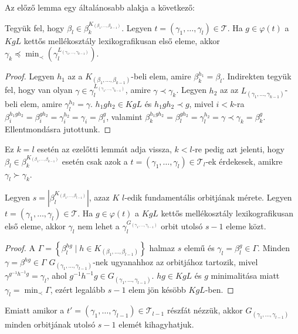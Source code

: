 Az előző lemma egy általánosabb alakja a következő:
\begin{lemma}
\label{thm:permbtcrit3}
Tegyük fel, hogy $\beta_l \in \beta_k^{K_{(\beta_1,\dots,\beta_{k-1})}}$.
Legyen $t = (\gamma_1, \dots, \gamma_l) \in \mathcal{T}$.
Ha $g \in \varphi(t)$ a $KgL$ kettős mellékosztály lexikografikusan első eleme, akkor $\gamma_k \preceq \min_{\prec}(\gamma_l^{L_{(\gamma_1,\dots,\gamma_{k-1})}})$.
\end{lemma}
\begin{proof}
Legyen $h_1$ az a $K_{(\beta_1,\dots,\beta_{k-1})}$-beli elem, amire $\beta_k^{h_1} = \beta_l$.
Indirekten tegyük fel, hogy van olyan $\gamma \in \gamma_l^{L_{(\gamma_1,\dots,\gamma_{k-1})}}$, amire $\gamma \prec \gamma_k$.
Legyen $h_2$ az az $L_{(\gamma_1,\dots,\gamma_{k-1})}$-beli elem, amire $\gamma_l^{h_2} = \gamma$.
$h_1gh_2 \in KgL$ és $h_1gh_2 \prec g$, mivel $i < k$-ra $\beta_i^{h_1gh_2} = \beta_i^{gh_2} = \gamma_i^{h_2} = \gamma_i = \beta_i^g$,
valamint $\beta_k^{h_1gh_2} = \beta_l^{gh_2} = \gamma_l^{h_2} = \gamma \prec \gamma_k = \beta_k^g$.
Ellentmondásra jutottunk.
\end{proof}
Ez $k=l$ esetén az ezelőtti lemmát adja vissza, $k < l$-re pedig azt jelenti, hogy $\beta_l \in \beta_k^{K_{(\beta_1,\dots,\beta_{k-1})}}$ esetén csak azok a $t = (\gamma_1, \dots, \gamma_l) \in \mathcal{T}_l$-ek
érdekesek, amikre $\gamma_l \succ \gamma_k$.

\begin{lemma}
\label{thm:permbtcrit4}
Legyen $s = \left| \beta_l^{K_{(\beta_1,\dots,\beta_{l-1})}} \right|$, azaz $K$ $l$-edik fundamentális orbitjának mérete.
Legyen $t = (\gamma_1, \dots, \gamma_l) \in \mathcal{T}$.
Ha $g \in \varphi(t)$ a $KgL$ kettős mellékosztály lexikografikusan első eleme, akkor $\gamma_l$ nem lehet a $\gamma_l^{G_{(\gamma_1,\dots,\gamma_{l-1})}}$ orbit utolsó $s-1$ eleme közt.
\end{lemma}
\begin{proof}
A $\Gamma = \left\{ \beta_l^{hg} \mid h \in K_{(\beta_1,\dots,\beta_{l-1})} \right\}$ halmaz $s$ elemű és $\gamma_l = \beta_l^g \in \Gamma$.
Minden $\gamma = \beta^{hg} \in \Gamma$ $G_{(\gamma_1,\dots,\gamma_{l-1})}$-nek ugyanahhoz az orbitjához tartozik, mivel $\gamma^{g^{-1}h^{-1}g} = \gamma_l$, ahol $g^{-1}h^{-1}g \in G_{(\gamma_1,\dots,\gamma_{l-1})}$.
$hg \in KgL$ és $g$ minimalitása miatt $\gamma_l = \min_{\prec} \Gamma$, ezért legalább $s-1$ elem jön késöbb $KgL$-ben.
\end{proof}
Emiatt amikor a $t' = (\gamma_1, \dots, \gamma_{l-1}) \in \mathcal{T}_{l-1}$ részfát nézzük, akkor $G_{(\gamma_1,\dots,\gamma_{l-1})}$ minden orbitjának utolsó $s-1$ elemét kihagyhatjuk.

